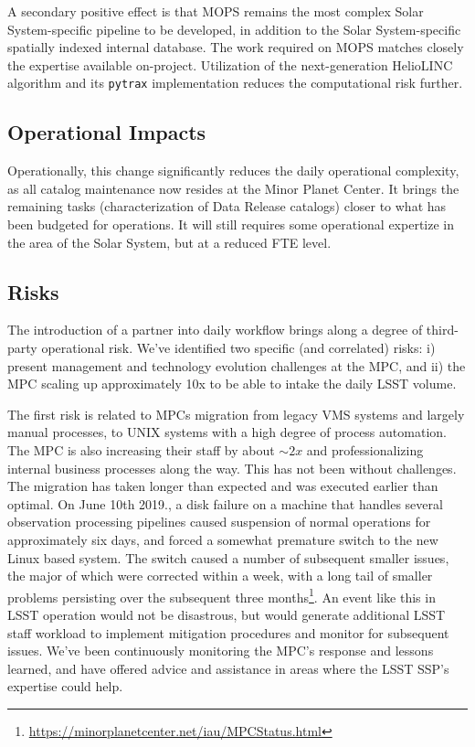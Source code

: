 \documentclass[DM,authoryear,toc,lsstdraft]{lsstdoc}
\begin{document}
A secondary positive effect is that MOPS remains the most complex Solar System-specific pipeline to be developed, in addition to the Solar System-specific spatially indexed internal database. The work required on MOPS matches closely the expertise available on-project. Utilization of the next-generation HelioLINC algorithm and its {\tt pytrax} implementation reduces the computational risk further.

\subsection{Operational Impacts}

Operationally, this change significantly reduces the daily operational complexity, as all catalog maintenance now resides at the Minor Planet Center. It brings the remaining tasks (characterization of Data Release catalogs) closer to what has been budgeted for operations. It will still requires some operational expertize in the area of the Solar System, but at a reduced FTE level.

\subsection{Risks}

The introduction of a partner into daily workflow brings along a degree of third-party operational risk. We've identified two specific (and correlated) risks: i) present management and technology evolution challenges at the MPC, and ii) the MPC scaling up approximately 10x to be able to intake the daily LSST volume.

The first risk is related to MPCs migration from legacy VMS systems and largely manual processes, to UNIX systems with a high degree of process automation. The MPC is also increasing their staff by about $\sim 2x$ and professionalizing internal business processes along the way. This has not been without challenges. The migration has taken longer than expected and was executed earlier than optimal. On June 10th 2019., a disk failure on a machine that handles several observation processing pipelines caused suspension of normal operations for approximately six days, and forced a somewhat premature switch to the new Linux based system. The switch caused a number of subsequent smaller issues, the major of which were corrected within a week, with a long tail of smaller problems persisting over the subsequent three months\footnote{\url{https://minorplanetcenter.net/iau/MPCStatus.html}}. An event like this in LSST operation would not be disastrous, but would generate additional LSST staff workload to implement mitigation procedures and monitor for subsequent issues. We've been continuously monitoring the MPC's response and lessons learned, and have offered advice and assistance in areas where the LSST SSP's expertise could help.
\end{document}
